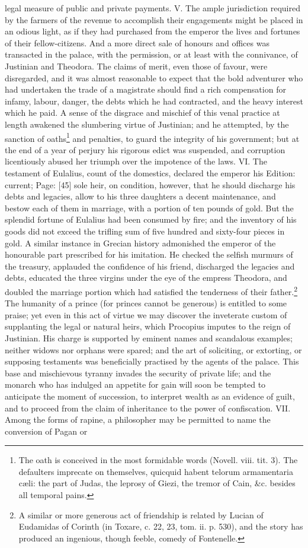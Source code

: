legal measure of public and private payments. V. The ample jurisdiction required by the farmers of the revenue to accomplish their engagements might be placed in an odious light, as if they had purchased from the emperor the lives and fortunes of their fellow-citizens. And a more direct sale of honours and offices was transacted in the palace, with the permission, or at least with the connivance, of Justinian and Theodora. The claims of merit, even those of favour, were disregarded, and it was almost reasonable to expect that the bold adventurer who had undertaken the trade of a magistrate should find a rich compensation for infamy, labour, danger, the debts which he had contracted, and the heavy interest which he paid. A sense of the disgrace and mischief of this venal practice at length awakened the slumbering virtue of Justinian; and he attempted, by the sanction of oaths\footnote{The oath is conceived in the most formidable words (Novell. viii. tit. 3). The defaulters imprecate on themselves, quicquid habent telorum armamentaria cæli: the part of Judas, the leprosy of Giezi, the tremor of Cain, \&c. besides all temporal pains.} and penalties, to guard the integrity of his government; but at the end of a year of perjury his rigorous edict was suspended, and corruption licentiously abused her triumph over the impotence of the laws. VI. The testament of Eulalius, count of the domestics, declared the emperor his Edition: current; Page: [45] sole heir, on condition, however, that he should discharge his debts and legacies, allow to his three daughters a decent maintenance, and bestow each of them in marriage, with a portion of ten pounds of gold. But the splendid fortune of Eulalius had been consumed by fire; and the inventory of his goods did not exceed the trifling sum of five hundred and sixty-four pieces in gold. A similar instance in Grecian history admonished the emperor of the honourable part prescribed for his imitation. He checked the selfish murmurs of the treasury, applauded the confidence of his friend, discharged the legacies and debts, educated the three virgins under the eye of the empress Theodora, and doubled the marriage portion which had satisfied the tenderness of their father.\footnote{A similar or more generous act of friendship is related by Lucian of Eudamidas of Corinth (in Toxare, c. 22, 23, tom. ii. p. 530), and the story has produced an ingenious, though feeble, comedy of Fontenelle.} The humanity of a prince (for princes cannot be generous) is entitled to some praise; yet even in this act of virtue we may discover the inveterate custom of supplanting the legal or natural heirs, which Procopius imputes to the reign of Justinian. His charge is supported by eminent names and scandalous examples; neither widows nor orphans were spared; and the art of soliciting, or extorting, or supposing testaments was beneficially practised by the agents of the palace. This base and mischievous tyranny invades the security of private life; and the monarch who has indulged an appetite for gain will soon be tempted to anticipate the moment of succession, to interpret wealth as an evidence of guilt, and to proceed from the claim of inheritance to the power of confiscation. VII. Among the forms of rapine, a philosopher may be permitted to name the conversion of Pagan or 